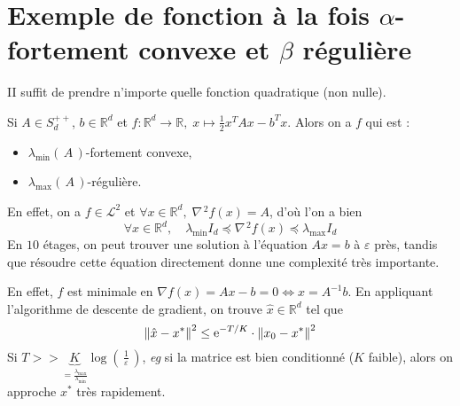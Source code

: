 \documentclass[11pt]{article}
\newcommand{\transpose}[1]{\ensuremath{#1^{\scriptscriptstyle T}}}
\newcommand{\dotpourvariable}{\:\cdot\:}
\newcommand{\ifempty}[3]{\ifx\hfuzz#1\hfuzz #2 \else #3\fi}
\newcommand{\norme}[1]{\left\lVert\ifempty{#1}{\dotpourvariable}{#1}\right\rVert}
\newcommand{\prt}[1]{\left( \, #1  \, \right)}
\newcommand{\R}{\mathbb{R}} %
\newcommand*{\e}{\ensuremath{\mathrm{e}}}
\def\eg{\textsl{eg}\xspace}
\begin{document}
\section{Exemple de fonction à la fois $\alpha$-fortement convexe et
 $\beta$ régulière}

 II suffit de prendre n'importe quelle fonction quadratique (non nulle).

 Si $A \in S_d^{++}$, $b \in \R^d$ et $f: \R^d \rightarrow \R, \; x \mapsto \frac{1}{2} \transpose{x}Ax-\transpose{b}x$.
 Alors on a $f$ qui est :
 \begin{itemize}
   \item $\lambda_{\min}\prt{A}$-fortement convexe,
   \item $\lambda_{\max}\prt{A}$-régulière.
 \end{itemize}

 En effet, on a $f \in \mathcal{L}^2$ et $ \forall x \in \R^d, \; \nabla\!^{\,2}f(x) = A$,
 d'où l'on a bien
 \begin{equation*}
   \forall x \in \R^d, \quad \lambda_{\min} I_d \preceq  \nabla\!^{\,2}f(x) \preceq
   \lambda_{\max} I_d
 \end{equation*}
 En $10$ étages, on peut trouver une solution à l'équation $Ax= b$ à $\varepsilon$
 près, tandis que résoudre cette équation directement donne une complexité très importante.

 En effet, $f$ est minimale en $\nabla\! f(x) = Ax-b = 0 \Leftrightarrow x=A^{-1}b$.
 En appliquant l'algorithme de descente de gradient, on trouve $\hat{x} \in \R^d$ tel que
 \begin{equation*}
\norme{\hat{x} - x^{*}}^2 \leq \e^{-T/K}\cdot \norme{x_0-x^{*}}^2
 \end{equation*}
 Si $T >> \underbrace{K}_{= \frac{\lambda_{\max}}{\lambda_{\min}}} \log \prt{\frac{1}{\varepsilon}} $, \eg si la matrice est bien conditionné ($K$ faible),
  alors on approche $x^{*}$ très rapidement.
\end{document}
